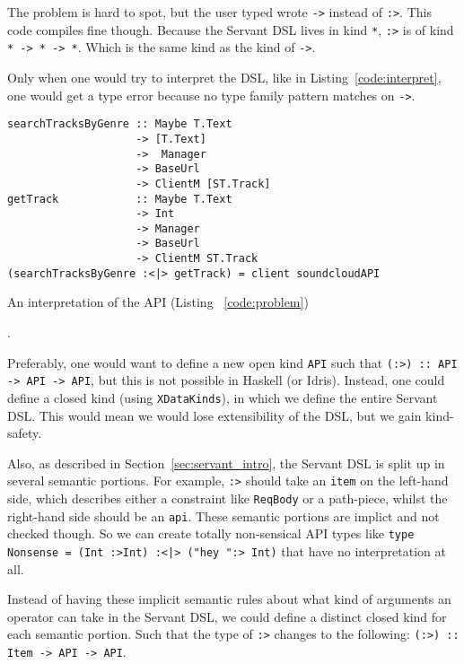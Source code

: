 \documentclass[12pt,a4paper]{article}
\begin{document}
The problem is hard to spot, but the user typed wrote \texttt{->} instead of \texttt{:>}.  This code compiles fine though. Because the Servant DSL lives in kind \texttt{*}, \texttt{:>} is   of kind \texttt{* -> * -> *}. Which is the same kind as the kind of \texttt{->}.

Only when one would try to interpret the DSL, like in Listing~\ref{code:interpret}, one would get a type error because no type family pattern matches on \texttt{->}.

\begin{listing}
\begin{verbatim}
searchTracksByGenre :: Maybe T.Text 
                    -> [T.Text]
                    ->  Manager
                    -> BaseUrl
                    -> ClientM [ST.Track]
getTrack            :: Maybe T.Text
                    -> Int
                    -> Manager
                    -> BaseUrl
                    -> ClientM ST.Track
(searchTracksByGenre :<|> getTrack) = client soundcloudAPI 
\end{verbatim}
  \caption{An interpretation of the API (Listing ~\ref{code:problem})}
  \label{code:interpret}.
\end{listing}

Preferably, one would want to define a new open kind \texttt{API} such that \texttt{(:>) :: API -> API -> API}, but this is not possible in Haskell (or Idris). Instead, one could define a closed kind (using \texttt{XDataKinds}), in which we define the entire Servant DSL. This would mean we would lose extensibility of the DSL, but we gain kind-safety.

Also, as described in Section~\ref{sec:servant_intro}, the Servant DSL is split up in several semantic portions.  For example, \texttt{:>} should take an \texttt{item} on the left-hand side, which describes either a constraint like \texttt{ReqBody} or a path-piece, whilst the right-hand side should be an \texttt{api}. These semantic portions are implict and not checked though. So we can create totally non-sensical API types like \texttt{type Nonsense = (Int :>Int) :<|> ("hey ":> Int)} that have no interpretation at all.

Instead of having these implicit semantic rules about what kind of arguments an operator can take in the Servant DSL, we could define a distinct closed kind for each semantic portion. Such that the type of \texttt{:>} changes to the following: \texttt{(:>) :: Item -> API -> API}.
\end{document}
